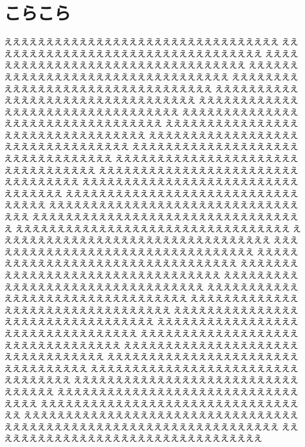 \documentclass{jbook}
\begin{document}
\section{こらこら}

えええええええええええええええええええええええええええええええええ
えええええええええええええええええええええええええええええええええ
えええええええええええええええええええええええええええええええええ
えええええええええええええええええええええええええええええええええ
えええええええええええええええええええええええええええええええええ
えええええええええええええええええええええええええええええええええ
えええええええええええええええええええええええええええええええええ
えええええええええええええええええええええええええええええええええ
えええええええええええええええええええええええええええええええええ
えええええええええええええええええええええええええええええええええ
えええええええええええええええええええええええええええええええええ
えええええええええええええええええええええええええええええええええ
えええええええええええええええええええええええええええええええええ
えええええええええええええええええええええええええええええええええ
えええええええええええええええええええええええええええええええええ
えええええええええええええええええええええええええええええええええ
えええええええええええええええええええええええええええええええええ
えええええええええええええええええええええええええええええええええ
えええええええええええええええええええええええええええええええええ
えええええええええええええええええええええええええええええええええ
えええええええええええええええええええええええええええええええええ
えええええええええええええええええええええええええええええええええ
えええええええええええええええええええええええええええええええええ
えええええええええええええええええええええええええええええええええ
えええええええええええええええええええええええええええええええええ
えええええええええええええええええええええええええええええええええ
えええええええええええええええええええええええええええええええええ
えええええええええええええええええええええええええええええええええ
えええええええええええええええええええええええええええええええええ
えええええええええええええええええええええええええええええええええ
えええええええええええええええええええええええええええええええええ
えええええええええええええええええええええええええええええええええ
えええええええええええええええええええええええええええええええええ
えええええええええええええええええええええええええええええええええ
えええええええええええええええええええええええええええええええええ
えええええええええええええええええええええええええええええええええ
えええええええええええええええええええええええええええええええええ
\end{document}
